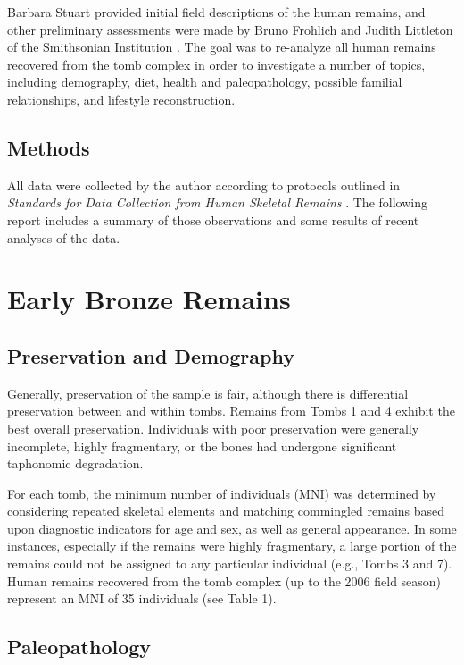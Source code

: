 \documentclass[]{book}
\begin{document}
Barbara Stuart provided initial field descriptions of the human remains,
and other preliminary assessments were made by Bruno Frohlich and Judith
Littleton of the Smithsonian Institution \citep{schwartz2007hidden}. The
goal was to re-analyze all human remains recovered from the tomb complex
in order to investigate a number of topics, including demography, diet,
health and paleopathology, possible familial relationships, and
lifestyle reconstruction.

\section{Methods}\label{methods}

All data were collected by the author according to protocols outlined in
\emph{Standards for Data Collection from Human Skeletal Remains}
\citep{standards1994}. The following report includes a summary of those
observations and some results of recent analyses of the data.

\chapter{Early Bronze Remains}\label{earlybronze}

\section{Preservation and Demography}\label{preservation-and-demography}

Generally, preservation of the sample is fair, although there is
differential preservation between and within tombs. Remains from Tombs 1
and 4 exhibit the best overall preservation. Individuals with poor
preservation were generally incomplete, highly fragmentary, or the bones
had undergone significant taphonomic degradation.

For each tomb, the minimum number of individuals (MNI) was determined by
considering repeated skeletal elements and matching commingled remains
based upon diagnostic indicators for age and sex, as well as general
appearance. In some instances, especially if the remains were highly
fragmentary, a large portion of the remains could not be assigned to any
particular individual (e.g., Tombs 3 and 7). Human remains recovered
from the tomb complex (up to the 2006 field season) represent an MNI of
35 individuals (see Table 1).

\section{Paleopathology}\label{paleopathology}
\end{document}
